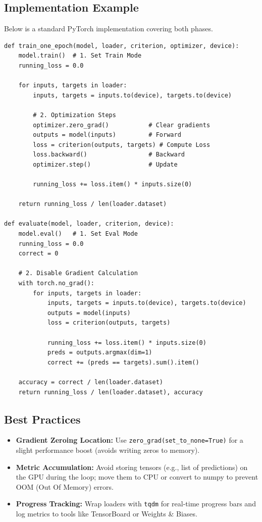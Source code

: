 \documentclass[12pt,a4paper]{report}
\begin{document}
\subsection{Implementation Example}
Below is a standard PyTorch implementation covering both phases.

\begin{verbatim}
def train_one_epoch(model, loader, criterion, optimizer, device):
    model.train()  # 1. Set Train Mode
    running_loss = 0.0
    
    for inputs, targets in loader:
        inputs, targets = inputs.to(device), targets.to(device)
        
        # 2. Optimization Steps
        optimizer.zero_grad()           # Clear gradients
        outputs = model(inputs)         # Forward
        loss = criterion(outputs, targets) # Compute Loss
        loss.backward()                 # Backward
        optimizer.step()                # Update
        
        running_loss += loss.item() * inputs.size(0)
        
    return running_loss / len(loader.dataset)

def evaluate(model, loader, criterion, device):
    model.eval()   # 1. Set Eval Mode
    running_loss = 0.0
    correct = 0
    
    # 2. Disable Gradient Calculation
    with torch.no_grad():
        for inputs, targets in loader:
            inputs, targets = inputs.to(device), targets.to(device)
            outputs = model(inputs)
            loss = criterion(outputs, targets)
            
            running_loss += loss.item() * inputs.size(0)
            preds = outputs.argmax(dim=1)
            correct += (preds == targets).sum().item()
            
    accuracy = correct / len(loader.dataset)
    return running_loss / len(loader.dataset), accuracy
\end{verbatim}

\subsection{Best Practices}
\begin{itemize}
    \item \textbf{Gradient Zeroing Location:} Use \texttt{zero\_grad(set\_to\_none=True)} for a slight performance boost (avoids writing zeros to memory).
    \item \textbf{Metric Accumulation:} Avoid storing tensors (e.g., list of predictions) on the GPU during the loop; move them to CPU or convert to numpy to prevent OOM (Out Of Memory) errors.
    \item \textbf{Progress Tracking:} Wrap loaders with \texttt{tqdm} for real-time progress bars and log metrics to tools like TensorBoard or Weights \& Biases.
\end{itemize}
\end{document}
